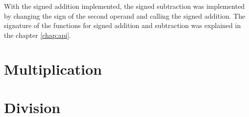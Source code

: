 \documentclass{book}
\begin{document}
With the signed addition implemented, the signed subtraction was implemented by changing the sign of the second operand and calling the signed addition. The signature of the functions for signed addition and subtraction was explained in the chapter \ref{chap:api}.

\section{Multiplication}

\section{Division}
 
\end{document}

